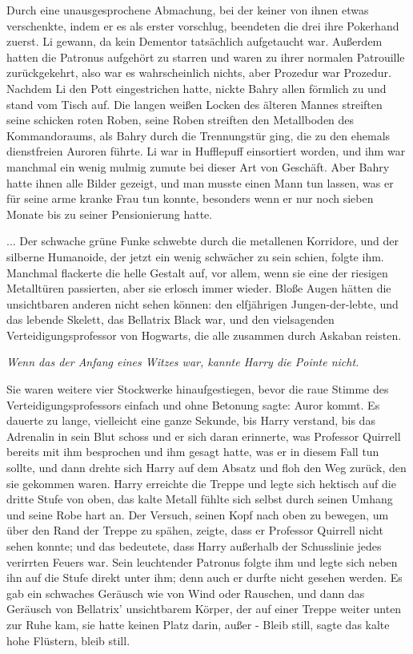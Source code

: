 Durch eine unausgesprochene Abmachung, bei der keiner von ihnen etwas
verschenkte, indem er es als erster vorschlug, beendeten die drei ihre Pokerhand
zuerst. Li gewann, da kein Dementor tatsächlich aufgetaucht war. Außerdem hatten
die Patronus aufgehört zu starren und waren zu ihrer normalen Patrouille
zurückgekehrt, also war es wahrscheinlich nichts, aber Prozedur war Prozedur.
Nachdem Li den Pott eingestrichen hatte, nickte Bahry allen förmlich zu und
stand vom Tisch auf. Die langen weißen Locken des älteren Mannes streiften seine
schicken roten Roben, seine Roben streiften den Metallboden des Kommandoraums,
als Bahry durch die Trennungstür ging, die zu den ehemals dienstfreien Auroren
führte. Li war in Hufflepuff einsortiert worden, und ihm war manchmal ein wenig
mulmig zumute bei dieser Art von Geschäft. Aber Bahry hatte ihnen alle Bilder
gezeigt, und man musste einen Mann tun lassen, was er für seine arme kranke Frau
tun konnte, besonders wenn er nur noch sieben Monate bis zu seiner Pensionierung
hatte.

... Der schwache grüne Funke schwebte durch die metallenen Korridore, und der
silberne Humanoide, der jetzt ein wenig schwächer zu sein schien, folgte ihm.
Manchmal flackerte die helle Gestalt auf, vor allem, wenn sie eine der riesigen
Metalltüren passierten, aber sie erlosch immer wieder. Bloße Augen hätten die
unsichtbaren anderen nicht sehen können: den elfjährigen Jungen-der-lebte, und
das lebende Skelett, das Bellatrix Black war, und den vielsagenden
Verteidigungsprofessor von Hogwarts, die alle zusammen durch Askaban reisten.

\emph{Wenn das der Anfang eines Witzes war, kannte Harry die Pointe nicht.}

Sie waren weitere vier Stockwerke hinaufgestiegen, bevor die raue Stimme des
Verteidigungsprofessors einfach und ohne Betonung sagte: \glqq{}Auror kommt.\grqq{} Es
dauerte zu lange, vielleicht eine ganze Sekunde, bis Harry verstand, bis das
Adrenalin in sein Blut schoss und er sich daran erinnerte, was Professor
Quirrell bereits mit ihm besprochen und ihm gesagt hatte, was er in diesem Fall
tun sollte, und dann drehte sich Harry auf dem Absatz und floh den Weg zurück,
den sie gekommen waren. Harry erreichte die Treppe und legte sich hektisch auf
die dritte Stufe von oben, das kalte Metall fühlte sich selbst durch seinen
Umhang und seine Robe hart an. Der Versuch, seinen Kopf nach oben zu bewegen, um
über den Rand der Treppe zu spähen, zeigte, dass er Professor Quirrell nicht
sehen konnte; und das bedeutete, dass Harry außerhalb der Schusslinie jedes
verirrten Feuers war. Sein leuchtender Patronus folgte ihm und legte sich neben
ihn auf die Stufe direkt unter ihm; denn auch er durfte nicht gesehen werden. Es
gab ein schwaches Geräusch wie von Wind oder Rauschen, und dann das Geräusch von
Bellatrix' unsichtbarem Körper, der auf einer Treppe weiter unten zur Ruhe kam,
sie hatte keinen Platz darin, außer - \glqq{}Bleib still\grqq{}, sagte das kalte
hohe Flüstern, \glqq{}bleib still.\grqq{}

